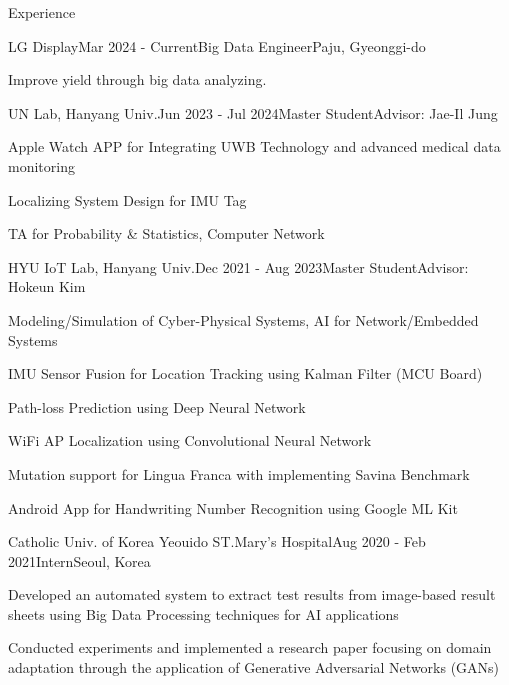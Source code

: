 \documentclass[
	11pt, %
]{resume} %
\begin{document}
\begin{rSection}{Experience}

	\begin{rSubsection}{LG Display}{Mar 2024 - Current}{Big Data Engineer}{Paju, Gyeonggi-do}
		\item Improve yield through big data analyzing.
	\end{rSubsection}


\begin{rSubsection}{UN Lab, Hanyang Univ.}{Jun 2023 - Jul 2024}{Master Student}{Advisor: Jae-Il Jung}
		\item Apple Watch APP for Integrating UWB Technology and advanced medical data monitoring
		\item Localizing System Design for IMU Tag
		\item TA for Probability \& Statistics, Computer Network
	\end{rSubsection}


	\begin{rSubsection}{HYU IoT Lab, Hanyang Univ.}{Dec 2021 - Aug 2023}{Master Student}{Advisor: Hokeun Kim}
		\item Modeling/Simulation of Cyber-Physical Systems, AI for Network/Embedded Systems
		\item IMU Sensor Fusion for Location Tracking using Kalman Filter (MCU Board)
		\item Path-loss Prediction using Deep Neural Network
		\item WiFi AP Localization using Convolutional Neural Network
		\item Mutation support for Lingua Franca with implementing Savina Benchmark
		\item Android App for Handwriting Number Recognition using Google ML Kit
	\end{rSubsection}


	\begin{rSubsection}{Catholic Univ. of Korea Yeouido ST.Mary's Hospital}{Aug 2020 - Feb 2021}{Intern}{Seoul, Korea}
		\item Developed an automated system to extract test results from image-based result sheets using Big Data Processing techniques for AI applications
		\item Conducted experiments and implemented a research paper focusing on domain adaptation through the application of Generative Adversarial Networks (GANs)
	\end{rSubsection}


\end{rSection}
\end{document}
